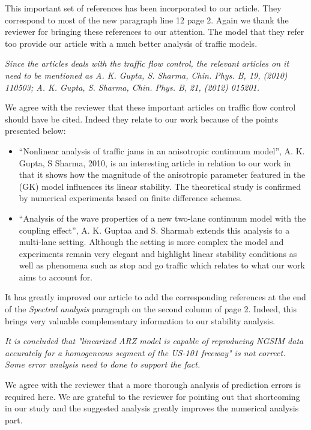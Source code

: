 \documentclass{article}
\begin{document}
This important set of references has been incorporated to our article. They correspond to most of the new paragraph line 12 page 2. Again we thank the reviewer for bringing these references to our attention. The model that they refer too provide our article with a much better analysis of traffic models.

\bigskip{}

\emph{
Since the articles deals with the traffic flow control, the relevant articles on it need to be mentioned as A. K. Gupta, S. Sharma, Chin. Phys. B, 19, (2010) 110503; A. K. Gupta, S. Sharma, Chin. Phys. B, 21, (2012) 015201.
}

We agree with the reviewer that these important articles on traffic flow control should have be cited. Indeed they relate to our work because of the points presented below:

\begin{itemize}
\item ``Nonlinear analysis of traffic jams in an anisotropic continuum model'', A. K. Gupta, S Sharma, 2010, is an interesting article in relation to our work in that it shows how the magnitude of the anisotropic parameter featured in the (GK) model influences its linear stability. The theoretical study is confirmed by numerical experiments based on finite difference schemes.
\item ``Analysis of the wave properties of a new two-lane continuum model with the coupling effect'', A. K. Guptaa and S. Sharmab extends this analysis to a multi-lane setting. Although the setting is more complex the model and experiments remain very elegant and highlight linear stability conditions as well as phenomena such as stop and go traffic which relates to what our work aims to account for.
\end{itemize}

It has greatly improved our article to add the corresponding references at the end of the \textit{Spectral analysis} paragraph on the second column of page 2. Indeed, this brings very valuable complementary information to our stability analysis.

\bigskip{}

\emph{
It is concluded that "linearized ARZ model is capable of reproducing NGSIM data accurately for a homogeneous segment of the US-101 freeway" is not correct. Some error analysis need to done to support the fact.
}

We agree with the reviewer that a more thorough analysis of prediction errors is required here. We are grateful to the reviewer for pointing out that shortcoming in our study and the suggested analysis greatly improves the numerical analysis part. 
\end{document}
